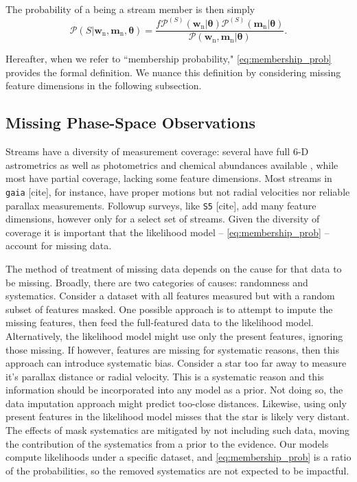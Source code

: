 \documentclass[twocolumn]{aastex631}
\newcommand{\dataarchive}[1]{\texttt{#1}}
\newcommand{\gaia}{\dataarchive{gaia}}
\newcommand{\mrm}[1]{\mathrm{#1}}
\newcommand{\mbs}[1]{\boldsymbol{#1}}
\newcommand{\mcal}[1]{\mathcal{#1}}
\newcommand{\pdf}{\mcal{P}}
\newcommand{\nth}[1]{{#1}_{\mrm{n}}}  %
\newcommand{\smallcomponent}[2]{#2^{\scriptscriptstyle (#1)}}
\newcommand{\cmp}[2]{\smallcomponent{#1}{#2}}
\newcommand{\Scmp}[1]{\cmp{S}{#1}}
\newcommand{\Spdf}{\Scmp{\pdf}}
\begin{document}
        The probability of a being a stream member is then simply
        \begin{equation}\label{eq:membership_prob}
            \pdf\left(S | \nth{\mbs{w}}, \nth{\mbs{m}}, \mbs{\theta} \right) = \frac{f \Spdf(\nth{\mbs{w}}|\mbs{\theta}) \Spdf(\nth{\mbs{m}}|\mbs{\theta}) }{ \pdf(\nth{\mbs{w}}, \nth{\mbs{m}} | \mbs{\theta})}.
        \end{equation}

        Hereafter, when we refer to ``membership probability,"
        \autoref{eq:membership_prob} provides the formal definition. We nuance
        this definition by considering missing feature dimensions in the
        following subsection.

    \subsection{Missing Phase-Space Observations} \label{sub:method:missing_data}

        Streams have a diversity of measurement coverage: several have full 6-D
        astrometrics as well as photometrics and chemical abundances available
        \citep[e.g.,][]{Koposov2019, 2020A&A...635L...3A, 2022ApJ...928...30L},
        while most have partial coverage, lacking some feature dimensions.
        Most streams in \gaia {\color{red} [cite]}, for instance, have proper
        motions but not radial velocities nor reliable parallax measurements.
        Followup surveys, like \dataarchive{S5} {\color{red} [cite]}, add many
        feature dimensions, however only for a select set of streams. Given the
        diversity of coverage it is important that the likelihood model --
        \autoref{eq:membership_prob} -- account for missing data.

        The method of treatment of missing data depends on the cause for that
        data to be missing.  Broadly, there are two categories of causes:
        randomness and systematics.  Consider a dataset with all features
        measured but with a random subset of features masked.  One possible
        approach is to attempt to impute the missing features, then feed the
        full-featured data to the likelihood model. Alternatively, the
        likelihood model might use only the present features, ignoring those
        missing. If however, features are missing for systematic reasons, then
        this approach can introduce systematic bias. Consider a star too far
        away to measure it's parallax distance or radial velocity. This is a
        systematic reason and this information should be incorporated into any
        model as a prior. Not doing so, the data imputation approach might
        predict too-close distances. Likewise, using only present features in
        the likelihood model misses that the star is likely very distant.  The
        effects of mask systematics are mitigated by not including such data,
        moving the contribution of the systematics from a prior to the evidence.
        Our models compute likelihoods under a specific dataset, and
        \autoref{eq:membership_prob} is a ratio of the probabilities, so the
        removed systematics are not expected to be impactful.
\end{document}
